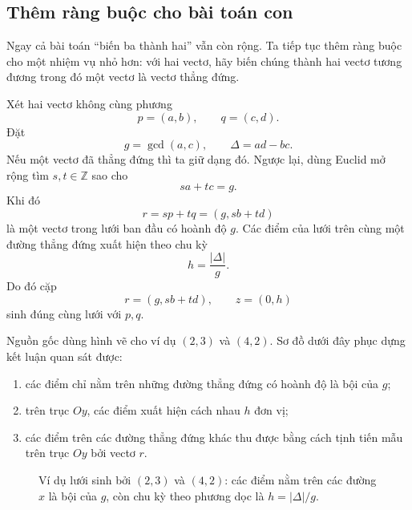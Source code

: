 \documentclass[11pt]{article}
\begin{document}
\subsection{Thêm ràng buộc cho bài toán con}

Ngay cả bài toán ``biến ba thành hai'' vẫn còn rộng. Ta tiếp tục thêm ràng
buộc cho một nhiệm vụ nhỏ hơn: với hai vectơ, hãy biến chúng thành hai vectơ
tương đương trong đó một vectơ là vectơ thẳng đứng.

Xét hai vectơ không cùng phương
\[
  p=(a,b),\qquad q=(c,d).
\]
Đặt
\[
  g=\gcd(a,c),\qquad \Delta=ad-bc.
\]
Nếu một vectơ đã thẳng đứng thì ta giữ dạng đó. Ngược lại, dùng Euclid mở
rộng tìm \(s,t\in\mathbb{Z}\) sao cho
\[
  sa+tc=g.
\]
Khi đó
\[
  r=sp+tq=(g,sb+td)
\]
là một vectơ trong lưới ban đầu có hoành độ \(g\). Các điểm của lưới trên cùng
một đường thẳng đứng xuất hiện theo chu kỳ
\[
  h=\frac{|\Delta|}{g}.
\]
Do đó cặp
\[
  r=(g,sb+td),\qquad z=(0,h)
\]
sinh đúng cùng lưới với \(p,q\).

Nguồn gốc dùng hình vẽ cho ví dụ \((2,3)\) và \((4,2)\). Sơ đồ dưới đây phục
dựng kết luận quan sát được:
\begin{enumerate}
  \item các điểm chỉ nằm trên những đường thẳng đứng có hoành độ là bội của
  \(g\);
  \item trên trục \(Oy\), các điểm xuất hiện cách nhau \(h\) đơn vị;
  \item các điểm trên các đường thẳng đứng khác thu được bằng cách tịnh tiến
  mẫu trên trục \(Oy\) bởi vectơ \(r\).
\end{enumerate}

\begin{figure}[ht]
\centering
{}
\caption{Ví dụ lưới sinh bởi \((2,3)\) và \((4,2)\): các điểm nằm trên các đường \(x\) là bội của \(g\), còn chu kỳ theo phương dọc là \(h=|\Delta|/g\).}
\end{figure}
\end{document}
